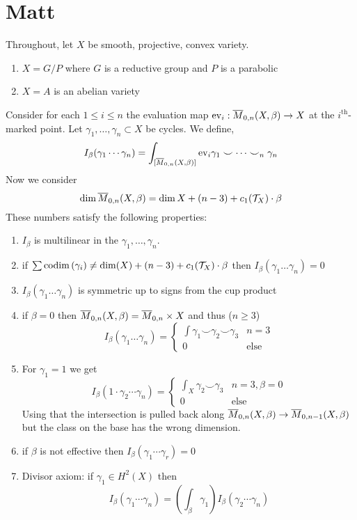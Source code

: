 \documentclass[12pt]{article}
\begin{document}
\section{Matt}

Throughout, let $X$ be smooth, projective, convex variety.

\begin{example}
\begin{enumerate}
\item $X = G / P$ where $G$ is a reductive group and $P$ is a parabolic
\item $X = A$ is an abelian variety
\end{enumerate}
\end{example}

Consider for each $1 \le i \le n$ the evaluation map $\mathrm{ev}_i : \overline{M}_{0,n}(X, \beta) \to X$ at the $i^{\text{th}}$-marked point. Let $\gamma_1, \dots, \gamma_n \subset X$ be cycles. We define,
\[ I_\beta(\gamma_1 \cdots \gamma_n) = \int_{[ \overline{M}_{0,n}(X, \beta) ]} \mathrm{ev}_i \gamma_1 \smile \cdots \smile_n \gamma_n \]
Now we consider
\[ \dim{\overline{M}_{0,n}(X, \beta)} = \dim{X} + (n-3) + c_1(\mathcal{T}_X) \cdot \beta \]
These numbers satisfy the following properties:
\begin{enumerate}
\item $I_\beta$ is multilinear in the $\gamma_1, \dots, \gamma_n$.
\item if $\sum \mathrm{codim}\left( \gamma_i \right) \neq \dim(X) + (n-3) + c_1(\mathcal{T}_X) \cdot \beta$ then $I_\beta(\gamma_1 \dots \gamma_n) = 0$
\item $I_\beta(\gamma_1 \dots \gamma_n)$ is symmetric up to signs from the cup product
\item if $\beta = 0$ then $\overline{M}_{0,n}(X, \beta) = \overline{M}_{0,n} \times X$ and thus ($n \ge 3$)
\[ I_\beta(\gamma_1 \dots \gamma_n) = 
\begin{cases}
\int \gamma_1 \smile  \gamma_2 \smile \gamma_3 & n = 3
\\
0 & \text{else}
\end{cases} \] 
\item For $\gamma_1 = 1$ we get
\[ I_\beta(1 \cdot \gamma_2 \cdots \gamma_n) = 
\begin{cases}
\int_X \gamma_2 \smile \gamma_3 & n = 3, \beta = 0
\\
0 & \text{else}
\end{cases} \]
Using that the intersection is pulled back along $\overline{M}_{0, n}(X, \beta) \to \overline{M}_{0,n-1}(X, \beta)$ but the class on the base has the wrong dimension. 
\item if $\beta$ is not effective then $I_\beta(\gamma_1 \cdots \gamma_r) = 0$
\item Divisor axiom: if $\gamma_1 \in H^2(X)$ then
\[ I_\beta(\gamma_1 \cdots \gamma_n) = \left( \int_\beta \gamma_1 \right) I_\beta(\gamma_2 \cdots \gamma_n) \] 
\end{enumerate}
\end{document}
